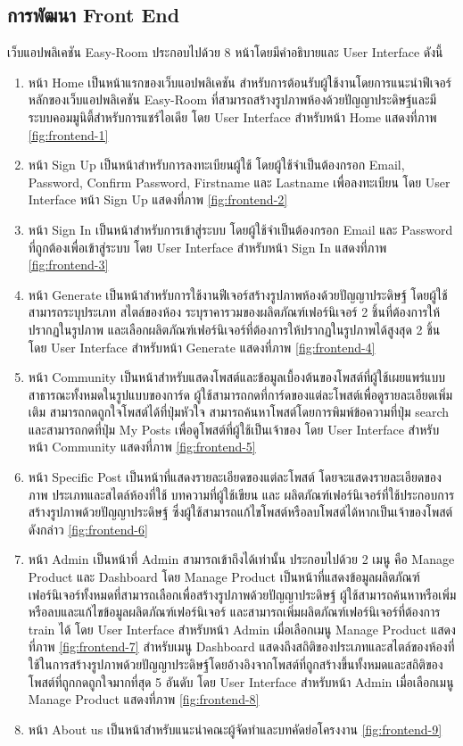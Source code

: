 \documentclass[12pt,oneside,openright,a4paper]{cpe-thai-project}
\begin{document}
\subsection{การพัฒนา Front End }
\hspace{18pt}เว็บแอปพลิเคชัน Easy-Room ประกอบไปด้วย 8 หน้าโดยมีคำอธิบายและ User Interface ดังนี้
\begin{enumerate}
  \item หน้า Home เป็นหน้าแรกของเว็บแอปพลิเคชัน สำหรับการต้อนรับผู้ใช้งานโดยการแนะนำฟีเจอร์หลักของเว็บแอปพลิเคชัน Easy-Room ที่สามารถสร้างรูปภาพห้องด้วยปัญญาประดิษฐ์และมีระบบคอมมูนิตี้สำหรับการแชร์ไอเดีย โดย User Interface สำหรับหน้า Home แสดงที่ภาพ \ref{fig:frontend-1}
  \item หน้า Sign Up เป็นหน้าสำหรับการลงทะเบียนผู้ใช้ โดยผู้ใช้จำเป็นต้องกรอก Email, Password, Confirm Password, Firstname และ Lastname เพื่อลงทะเบียน  โดย User Interface หน้า Sign Up แสดงที่ภาพ \ref{fig:frontend-2}
  \item หน้า Sign In เป็นหน้าสำหรับการเข้าสู่ระบบ โดยผู้ใช้จำเป็นต้องกรอก Email และ Password ที่ถูกต้องเพื่อเข้าสู่ระบบ โดย User Interface สำหรับหน้า Sign In แสดงที่ภาพ \ref{fig:frontend-3}
  \item หน้า Generate เป็นหน้าสำหรับการใช้งานฟีเจอร์สร้างรูปภาพห้องด้วยปัญญาประดิษฐ์ โดยผู้ใช้สามารถระบุประเภท สไตล์ของห้อง ระบุราคารวมของผลิตภัณฑ์เฟอร์นิเจอร์ 2 ชิ้นที่ต้องการให้ปรากฏในรูปภาพ และเลือกผลิตภัณฑ์เฟอร์นิเจอร์ที่ต้องการให้ปรากฏในรูปภาพได้สูงสุด 2 ชิ้น โดย User Interface สำหรับหน้า Generate แสดงที่ภาพ \ref{fig:frontend-4}
  \item หน้า Community เป็นหน้าสำหรับแสดงโพสต์และข้อมูลเบื้องต้นของโพสต์ที่ผู้ใช้เผยแพร่แบบสาธารณะทั้งหมดในรูปแบบของการ์ด ผู้ใช้สามารถกดที่การ์ดของแต่ละโพสต์เพื่อดูรายละเอียดเพิ่มเติม สามารถกดถูกใจโพสต์ได้ที่ปุ่มหัวใจ สามารถค้นหาโพสต์โดยการพิมพ์ข้อความที่ปุ่ม search และสามารถกดที่ปุ่ม My Posts เพื่อดูโพสต์ที่ผู้ใช้เป็นเจ้าของ โดย User Interface สำหรับหน้า Community แสดงที่ภาพ \ref{fig:frontend-5}
  \item หน้า Specific Post เป็นหน้าที่แสดงรายละเอียดของแต่ละโพสต์ โดยจะแสดงรายละเอียดของภาพ ประเภทและสไตล์ห้องที่ใช้ บทความที่ผู้ใช้เขียน และ ผลิตภัณฑ์เฟอร์นิเจอร์ที่ใช้ประกอบการสร้างรูปภาพด้วยปัญญาประดิษฐ์ ซึ่งผู้ใช้สามารถแก้ไขโพสต์หรือลบโพสต์ได้หากเป็นเจ้าของโพสต์ดังกล่าว \ref{fig:frontend-6}
  \item หน้า Admin เป็นหน้าที่ Admin สามารถเข้าถึงได้เท่านั้น ประกอบไปด้วย 2 เมนู คือ Manage Product และ Dashboard โดย Manage Product เป็นหน้าที่แสดงข้อมูลผลิตภัณฑ์เฟอร์นิเจอร์ทั้งหมดที่สามารถเลือกเพื่อสร้างรูปภาพด้วยปัญญาประดิษฐ์ ผู้ใช้สามารถค้นหาหรือเพิ่มหรือลบและแก้ไขข้อมูลผลิตภัณฑ์เฟอร์นิเจอร์ และสามารถเพิ่มผลิตภัณฑ์เฟอร์นิเจอร์ที่ต้องการ train ได้ โดย User Interface สำหรับหน้า Admin เมื่อเลือกเมนู Manage Product แสดงที่ภาพ \ref{fig:frontend-7} สำหรับเมนู Dashboard แสดงถึงสถิติของประเภทและสไตล์ของห้องที่ใช้ในการสร้างรูปภาพด้วยปัญญาประดิษฐ์โดยอ้างอิงจากโพสต์ที่ถูกสร้างขึ้นทั้งหมดและสถิติของโพสต์ที่ถูกกดถูกใจมากที่สุด 5 อันดับ  โดย User Interface สำหรับหน้า Admin เมื่อเลือกเมนู Manage Product แสดงที่ภาพ \ref{fig:frontend-8}
  \item หน้า About us เป็นหน้าสำหรับแนะนำคณะผู้จัดทำและบทคัดย่อโครงงาน \ref{fig:frontend-9}
\end{enumerate}
\end{document}
